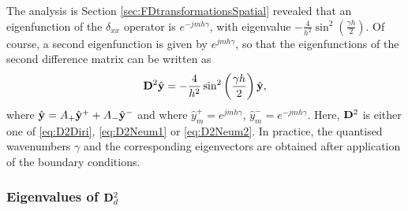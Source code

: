 \documentclass[11pt,twoside,a4paper,english]{book}
\newcommand{\dss}{\delta_{xx}}
\begin{document}
The analysis is Section  \ref{sec:FDtransformationsSpatial} revealed that an eigenfunction of the $\dss$ operator is $e^{-jm h \gamma}$, with eigenvalue $-\frac{4}{h^2}\sin^2\left( \frac{\gamma h}{2}\right)$. Of course, a second eigenfunction is given by $e^{jm h \gamma}$, so that the eigenfunctions of the second difference matrix can  be written as
\begin{equation}
{\bf D}^2 \hat {\bf y} = -\frac{4}{h^2}\sin^2\left( \frac{\gamma h}{2}\right)\hat {\bf y},
\end{equation}
where $\hat {\bf y} = A_+ \hat {\bf y}^+ + A_- \hat {\bf y}^- $ and where $\hat { y}^+_m = e^{jmh\gamma}$, $\hat { y}^-_m = e^{-jmh\gamma}$. Here, ${\bf D}^2$ is either one of \eqref{eq:D2Diri}, \eqref{eq:D2Neum1} or \eqref{eq:D2Neum2}. In practice, the quantised wavenumbers $\gamma$ and the corresponding eigenvectors are obtained after application of the boundary conditions. 


\subsubsection{Eigenvalues of ${\bf D}^2_d$}
\end{document}

